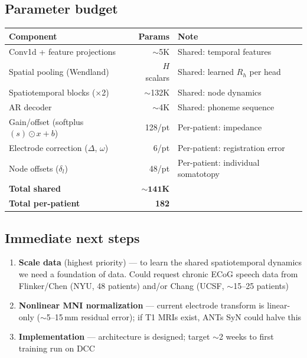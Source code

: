 \documentclass[11pt,letterpaper]{article}
\begin{document}
\subsection*{Parameter budget}

\begin{table}[ht]\centering\small
\begin{tabular}{@{}lrl@{}}
\toprule
\textbf{Component} & \textbf{Params} & \textbf{Note} \\
\midrule
Conv1d + feature projections & ${\sim}$5K & Shared: temporal features \\
Spatial pooling (Wendland) & $H$ scalars & Shared: learned $R_h$ per head \\
Spatiotemporal blocks ($\times$2) & ${\sim}$132K & Shared: node dynamics \\
AR decoder & ${\sim}$4K & Shared: phoneme sequence \\
\midrule
Gain/offset (softplus$(s) \odot x + b$) & 128/pt & Per-patient: impedance \\
Electrode correction ($\Delta$, $\omega$) & 6/pt & Per-patient: registration error \\
Node offsets ($\delta_l$) & 48/pt & Per-patient: individual somatotopy \\
\midrule
\textbf{Total shared} & $\mathbf{{\sim}141}$\textbf{K} & \\
\textbf{Total per-patient} & \textbf{182} & \\
\bottomrule
\end{tabular}
\end{table}

\subsection*{Immediate next steps}

\begin{enumerate}[leftmargin=2em]
\item \textbf{Scale data} (highest priority) --- to learn the shared spatiotemporal dynamics we need a foundation of data. Could request chronic ECoG speech data from Flinker/Chen (NYU, 48 patients) and/or Chang (UCSF, ${\sim}$15--25 patients)
\item \textbf{Nonlinear MNI normalization} --- current electrode transform is linear-only (${\sim}$5--15\,mm residual error); if T1 MRIs exist, ANTs SyN could halve this
\item \textbf{Implementation} --- architecture is designed; target ${\sim}$2 weeks to first training run on DCC
\end{enumerate}
\end{document}
